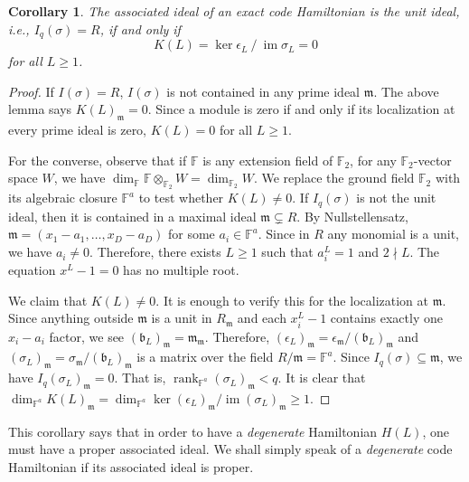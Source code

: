 \documentclass[letterpaper,12pt]{amsart}
\newtheorem{cor}[lem]{Corollary}
\theoremstyle{definition} \newtheorem{defn}{Definition}
\theoremstyle{definition} \newtheorem{rem}{Remark}
\theoremstyle{definition} \newtheorem{example}{Example}
\newcommand{\im}{\mathop{\mathrm{im}}}
\newcommand{\rank}{\mathop{\mathrm{rank}}}
\newcommand{\FF}{\mathbb{F}}
\newcommand{\mm}{\mathfrak{m}}
\newcommand{\bb}{\mathfrak{b}}
\begin{document}
\begin{cor}
The associated ideal of an exact code Hamiltonian
is the unit ideal, i.e., $I_q(\sigma) = R$,
if and only if
\[
K(L) = \ker \epsilon_L ~/~ \im \sigma_L = 0
\]
for all $L \ge 1$.
\label{cor:unit-characteristic-ideal-means-nondegeneracy}
\end{cor}
\begin{proof}
If $I(\sigma) = R$,
$I(\sigma)$ is not contained in any prime ideal $\mm$.
The above lemma says $K(L)_\mm = 0$.
Since a module is zero 
if and only if its localization at every prime ideal is zero,
$K(L) = 0$ for all $L \ge 1$.

For the converse, observe that
if $\FF$ is any extension field of $\FF_2$,
for any $\FF_2$-vector space $W$,
we have $\dim_\FF \FF \otimes_{\FF_2} W = \dim_{\FF_2} W$.
We replace the ground field $\FF_2$ with its algebraic closure $\FF^a$ to test whether $K(L) \ne 0$.
If $I_q(\sigma)$ is not the unit ideal, then it is contained in a maximal ideal $\mm \subsetneq R$.
By Nullstellensatz, $\mm = (x_1 - a_1,\ldots,x_D - a_D)$ for some $a_i \in \FF^a$.
Since in $R$ any monomial is a unit, we have $a_i \ne 0$.
Therefore, there exists $L \ge 1$ such that $a_i^L = 1$ and $2 \nmid L$.
The equation $x^L-1=0$ has no multiple root.

We claim that $K(L) \ne 0$. It is enough to verify this for the localization at $\mm$.
Since anything outside $\mm$ is a unit in $R_\mm$
and each $x_i^L-1$ contains exactly one $x_i - a_i$ factor,
we see $(\bb_L)_\mm = \mm_\mm$.
Therefore, $(\epsilon_L)_\mm = \epsilon_\mm / (\bb_L)_\mm$ and
$(\sigma_L)_\mm = \sigma_\mm / (\bb_L)_\mm$ is a matrix over the field $R/\mm = \FF^a$.
Since $I_q(\sigma) \subseteq \mm$, we have $I_q(\sigma_L)_\mm = 0$.
That is, $\rank_{\FF^a} (\sigma_L)_\mm < q$.
It is clear that $\dim_{\FF^a} K(L)_\mm = \dim_{\FF^a} \ker (\epsilon_L)_\mm / \im (\sigma_L)_\mm \ge 1$.
\end{proof}
This corollary says that in order to have a {\em degenerate} Hamiltonian $H(L)$,
one must have a proper associated ideal.
We shall simply speak of a {\em degenerate} code Hamiltonian
if its associated ideal is proper.
\end{document}
